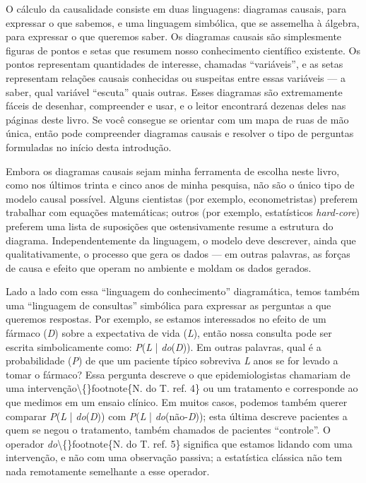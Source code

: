 \documentclass[11pt,a5paper,twoside]{book}
\begin{document}
O cálculo da causalidade consiste em duas linguagens: diagramas causais, para expressar o que sabemos, e uma linguagem simbólica, que se assemelha à álgebra, para expressar o que queremos saber. Os diagramas causais são simplesmente figuras de pontos e setas que resumem nosso conhecimento científico existente. Os pontos representam quantidades de interesse, chamadas “variáveis”, e as setas representam relações causais conhecidas ou suspeitas entre essas variáveis — a saber, qual variável “escuta” quais outras. Esses diagramas são extremamente fáceis de desenhar, compreender e usar, e o leitor encontrará dezenas deles nas páginas deste livro. Se você consegue se orientar com um mapa de ruas de mão única, então pode compreender diagramas causais e resolver o tipo de perguntas formuladas no início desta introdução.

Embora os diagramas causais sejam minha ferramenta de escolha neste livro, como nos últimos trinta e cinco anos de minha pesquisa, não são o único tipo de modelo causal possível. Alguns cientistas (por exemplo, econometristas) preferem trabalhar com equações matemáticas; outros (por exemplo, estatísticos \textit{hard-core}) preferem uma lista de suposições que ostensivamente resume a estrutura do diagrama. Independentemente da linguagem, o modelo deve descrever, ainda que qualitativamente, o processo que gera os dados — em outras palavras, as forças de causa e efeito que operam no ambiente e moldam os dados gerados.

Lado a lado com essa “linguagem do conhecimento” diagramática, temos também uma “linguagem de consultas” simbólica para expressar as perguntas a que queremos respostas. Por exemplo, se estamos interessados no efeito de um fármaco (\textit{D}) sobre a expectativa de vida (\textit{L}), então nossa consulta pode ser escrita simbolicamente como: \textit{P}(\textit{L} | \textit{do}(\textit{D})). Em outras palavras, qual é a probabilidade (\textit{P}) de que um paciente típico sobreviva \textit{L} anos se for levado a tomar o fármaco? Essa pergunta descreve o que epidemiologistas chamariam de uma intervenção\textbackslash\{\}footnote\{N. do T. ref. 4\} ou um tratamento e corresponde ao que medimos em um ensaio clínico. Em muitos casos, podemos também querer comparar \textit{P}(\textit{L} | \textit{do}(\textit{D})) com \textit{P}(\textit{L} | \textit{do}(não-\textit{D})); esta última descreve pacientes a quem se negou o tratamento, também chamados de pacientes “controle”. O operador \textit{do}\textbackslash\{\}footnote\{N. do T. ref. 5\} significa que estamos lidando com uma intervenção, e não com uma observação passiva; a estatística clássica não tem nada remotamente semelhante a esse operador.
\end{document}
